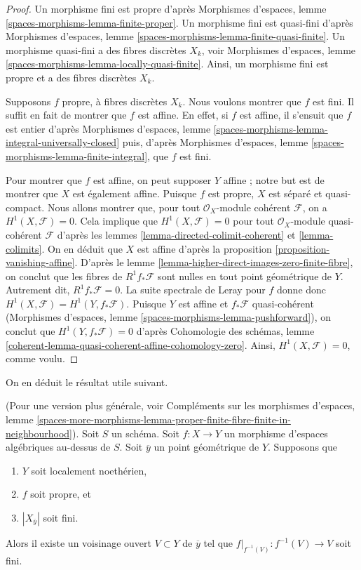 \begin{proof}
Un morphisme fini est propre d'après
Morphismes d'espaces, lemme \ref{spaces-morphisms-lemma-finite-proper}.
Un morphisme fini est quasi-fini d'après
Morphismes d'espaces, lemme \ref{spaces-morphisms-lemma-finite-quasi-finite}.
Un morphisme quasi-fini a des fibres discrètes $X_k$, voir
Morphismes d'espaces, lemme \ref{spaces-morphisms-lemma-locally-quasi-finite}.
Ainsi, un morphisme fini est propre et a des fibres discrètes $X_k$.

\medskip\noindent
Supposons $f$ propre, à fibres discrètes $X_k$.
Nous voulons montrer que $f$ est fini.
Il suffit en fait de montrer que $f$ est affine.
En effet, si $f$ est affine, il s'ensuit que
$f$ est entier d'après
Morphismes d'espaces, lemme
\ref{spaces-morphisms-lemma-integral-universally-closed}
puis, d'après
Morphismes d'espaces, lemme \ref{spaces-morphisms-lemma-finite-integral},
que $f$ est fini.

\medskip\noindent
Pour montrer que $f$ est affine, on peut supposer $Y$ affine ; notre
but est de montrer que $X$ est également affine.
Puisque $f$ est propre, $X$ est séparé et quasi-compact.
Nous allons montrer que, pour tout
$\mathcal{O}_X$-module cohérent $\mathcal{F}$, on a $H^1(X, \mathcal{F}) = 0$.
Cela implique que $H^1(X, \mathcal{F}) = 0$ pour tout
$\mathcal{O}_X$-module quasi-cohérent $\mathcal{F}$ d'après les
lemmes \ref{lemma-directed-colimit-coherent} et \ref{lemma-colimits}.
On en déduit que $X$ est affine d'après la
proposition \ref{proposition-vanishing-affine}. D'après le
lemme \ref{lemma-higher-direct-images-zero-finite-fibre},
on conclut que les fibres de $R^1f_*\mathcal{F}$
sont nulles en tout point géométrique de $Y$.
Autrement dit, $R^1f_*\mathcal{F} = 0$. La suite spectrale de Leray
pour $f$ donne donc
$H^1(X , \mathcal{F}) = H^1(Y, f_*\mathcal{F})$.
Puisque $Y$ est affine et $f_*\mathcal{F}$ quasi-cohérent
(Morphismes d'espaces, lemme \ref{spaces-morphisms-lemma-pushforward}),
on conclut que $H^1(Y, f_*\mathcal{F}) = 0$
d'après
Cohomologie des schémas, lemme
\ref{coherent-lemma-quasi-coherent-affine-cohomology-zero}.
Ainsi, $H^1(X, \mathcal{F}) = 0$, comme voulu.
\end{proof}

\noindent
On en déduit le résultat utile suivant.

\begin{lemma}
\label{lemma-proper-finite-fibre-finite-in-neighbourhood}
(Pour une version plus générale, voir
Compléments sur les morphismes d'espaces, lemme
\ref{spaces-more-morphisms-lemma-proper-finite-fibre-finite-in-neighbourhood}).
Soit $S$ un schéma. Soit $f : X \to Y$ un morphisme d'espaces algébriques
au-dessus de $S$. Soit $\overline{y}$ un point géométrique de $Y$.
Supposons que
\begin{enumerate}
\item $Y$ soit localement noethérien,
\item $f$ soit propre, et
\item $|X_{\overline{y}}|$ soit fini.
\end{enumerate}
Alors il existe un voisinage ouvert $V \subset Y$ de $\overline{y}$
tel que $f|_{f^{-1}(V)} : f^{-1}(V) \to V$ soit fini.
\end{lemma}

